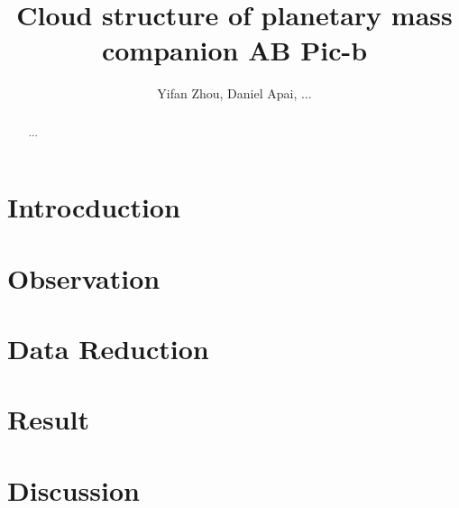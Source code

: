 \documentclass[iop]{emulateapj}
\begin{document}
\title{Cloud structure of planetary mass companion AB Pic-b}
\author{Yifan Zhou, Daniel Apai, ...}

\begin{abstract}
...
\end{abstract}

\maketitle
\section{Introcduction}

\section{Observation}
\section{Data Reduction}
\section{Result}
\section{Discussion}
\end{document}
